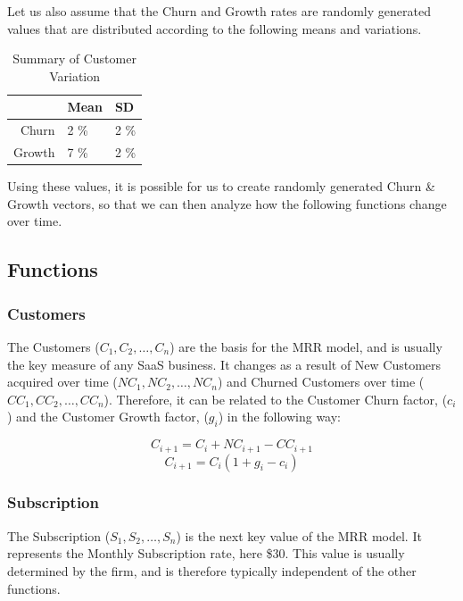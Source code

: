 \documentclass[11pt]{article}
\begin{document}
Let us also assume that the Churn and Growth rates are randomly generated values that are distributed according to the following means and variations.  


\begin{table}[ht]
\centering
\begin{tabular}{rll}
  \hline
 & Mean & SD \\ 
  \hline
Churn & 2 \% & 2 \% \\ 
  Growth & 7 \% & 2 \% \\ 
   \hline
\end{tabular}
\caption{Summary of Customer Variation} 
\end{table}
Using these values, it is possible for us to create randomly generated Churn \& Growth vectors, so that we can then analyze how the following functions change over time.

\newpage

\subsection*{Functions}




\subsubsection*{Customers}

The Customers ($C_{1}, C_{2}, \ldots, C_{n}$) are the basis for the MRR model, and is usually the key measure of any SaaS business. It changes as a result of New Customers acquired over time ($NC_1, NC_2, \ldots, NC_n$) and Churned Customers over time ($CC_{1}, CC_{2}, \ldots, CC_{n}$). Therefore, it can be related to the Customer Churn factor, ($c_{i}$) and the Customer Growth factor, ($g_{i}$) in the following way:

\[
C_{i+1} = C_{i} + NC_{i+1} - CC_{i+1}
\]
\[
C_{i+1} = C_{i}(1 + g_{i} - c_{i})
\]


\subsubsection*{Subscription}

The Subscription ($S_{1}, S_{2}, \ldots, S_{n}$) is the next key value of the MRR model. It represents the Monthly Subscription rate, here \$$30$. This value is usually determined by the firm, and is therefore typically independent of the other functions. 
\end{document}
